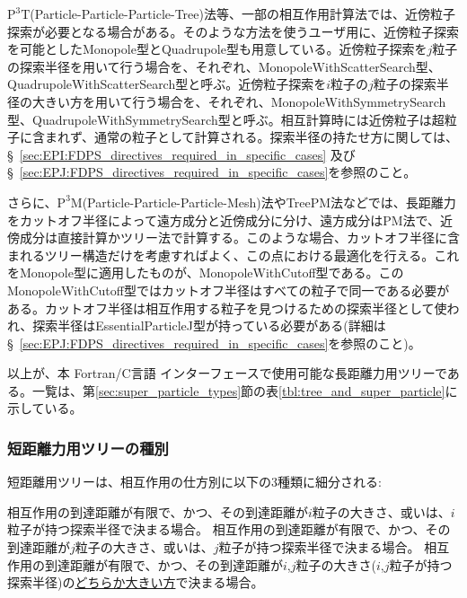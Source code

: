 $\mathrm{P^{3}T}$(Particle-Particle-Particle-Tree)法等、一部の相互作用計算法では、近傍粒子探索が必要となる場合がある。そのような方法を使うユーザ用に、近傍粒子探索を可能としたMonopole型とQuadrupole型も用意している。近傍粒子探索を$j$粒子の探索半径を用いて行う場合を、それぞれ、MonopoleWithScatterSearch型、QuadrupoleWithScatterSearch型と呼ぶ。近傍粒子探索を$i$粒子の$j$粒子の探索半径の大きい方を用いて行う場合を、それぞれ、MonopoleWithSymmetrySearch型、QuadrupoleWithSymmetrySearch型と呼ぶ。相互計算時には近傍粒子は超粒子に含まれず、通常の粒子として計算される。探索半径の持たせ方に関しては、\S~\ref{sec:EPI:FDPS_directives_required_in_specific_cases} 及び \S~\ref{sec:EPJ:FDPS_directives_required_in_specific_cases}を参照のこと。

さらに、$\mathrm{P^{3}M}$(Particle-Particle-Particle-Mesh)法やTreePM法などでは、長距離力をカットオフ半径によって遠方成分と近傍成分に分け、遠方成分はPM法で、近傍成分は直接計算かツリー法で計算する。このような場合、カットオフ半径に含まれるツリー構造だけを考慮すればよく、この点における最適化を行える。これをMonopole型に適用したものが、MonopoleWithCutoff型である。このMonopoleWithCutoff型ではカットオフ半径はすべての粒子で同一である必要がある。カットオフ半径は相互作用する粒子を見つけるための探索半径として使われ、探索半径はEssentialParticleJ型が持っている必要がある(詳細は\S~\ref{sec:EPJ:FDPS_directives_required_in_specific_cases}を参照のこと)。

以上が、本 Fortran/C言語 インターフェースで使用可能な長距離力用ツリーである。一覧は、第\ref{sec:super_particle_types}節の表\ref{tbl:tree_and_super_particle}に示している。


\subsubsection{短距離力用ツリーの種別}
\label{subsubsec:tree_kinds_short}
短距離用ツリーは、相互作用の仕方別に以下の3種類に細分される:
\begin{enumerate}[leftmargin=*]
 相互作用の到達距離が有限で、かつ、その到達距離が$i$粒子の大きさ、或いは、$i$粒子が持つ探索半径で決まる場合。
 相互作用の到達距離が有限で、かつ、その到達距離が$j$粒子の大きさ、或いは、$j$粒子が持つ探索半径で決まる場合。
 相互作用の到達距離が有限で、かつ、その到達距離が$i$,$j$粒子の大きさ($i$,$j$粒子が持つ探索半径)の\uline{どちらか大きい方}で決まる場合。
\end{enumerate}


\clearpage

